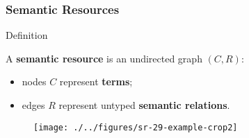 
\begin{frame}
\frametitle{Semantic Resources}

\begin{block}{Definition}

A \textbf{semantic resource} is an undirected graph $(C, R)$:
\begin{itemize}
\item nodes $C$ represent \textbf{terms};
\item edges $R$ represent untyped \textbf{semantic relations}.
\end{itemize}

\end{block}

\begin{figure}
\centering
\texttt{[image: ./../figures/sr-29-example-crop2]}
\end{figure}

\end{frame}

